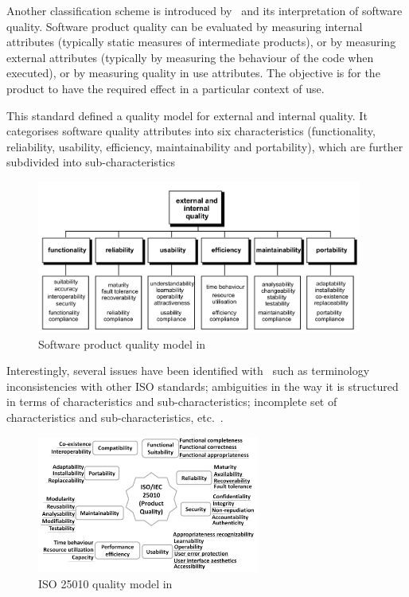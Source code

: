 \documentclass[dissertation,final]{softeng}
\begin{document}
Another classification scheme is introduced by~ and its interpretation of software quality. Software product quality can be evaluated by measuring internal attributes (typically static measures of intermediate products), or by measuring external attributes (typically by measuring the behaviour of the code when executed), or by measuring quality in use attributes. The objective is for the product to have the required effect in a particular context of use.

This standard defined a quality model for external and internal quality. It categorises software quality attributes into six characteristics (functionality, reliability, usability, efficiency, maintainability and portability), which are further subdivided into sub-characteristics

\begin{figure}[h]
\includegraphics[width=0.95\textwidth]{QualityInLifecycle}
\centering
\caption[Software product quality model]{Software product quality model in ~}
\label{fig:QualityInLifecycle}
\end{figure}

Interestingly, several issues have been identified with~ such as terminology inconsistencies with other ISO standards; ambiguities in the way it is structured in terms of characteristics and sub-characteristics; incomplete set of characteristics and sub-characteristics, etc.~\citep{Al-Qutaish}.

\begin{figure}[h]
\includegraphics[width=0.65\textwidth]{iso25010}
\centering
\caption[ISO 25010 quality model]{ISO 25010 quality model in ~}
\label{fig:iso25010}
\end{figure}
\end{document}
